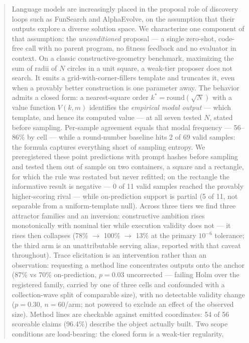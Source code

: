 \documentclass[11pt]{article}
\begin{document}
\begin{abstract}
Language models are increasingly placed in the proposal role of discovery loops such as
FunSearch and AlphaEvolve, on the assumption that their outputs explore a diverse solution
space. We characterize one component of that assumption: the \textit{unconditioned} proposal --- a
single zero-shot, code-free call with no parent program, no fitness feedback and no evaluator
in context. On a classic constructive-geometry benchmark, maximizing the sum of radii of $N$
circles in a unit square, a weak-tier proposer does not search. It emits a
grid-with-corner-fillers template and truncates it, even when a provably better construction is
one parameter away. The behavior admits a closed form: a nearest-square order $k^{*} = \mathrm{round}(\sqrt{N})$
with a value function $V(k, m)$ identifies the \textit{empirical modal output} --- which template, and
hence its computed value --- at all seven tested $N$, stated before sampling. Per-sample agreement equals that modal frequency --- 56--86\% by
cell --- while a round-number baseline hits 2 of 69 valid samples: the formula captures
everything short of sampling entropy. We preregistered these point predictions with prompt
hashes before sampling and tested them out of sample on two containers, a square and a
rectangle, for which the rule was restated but never refitted; on the rectangle the informative
result is negative --- 0 of 11 valid samples reached the provably higher-scoring rival --- while
on-prediction support is partial (5 of 11, not separable from a uniform-template null). Across three tiers we find three
attractor families and an inversion: constructive ambition rises monotonically with nominal
tier while execution validity does not --- it rises then collapses (78\% $\rightarrow$ 100\% $\rightarrow$ 13\% at the
primary $10^{-6}$ tolerance; the third arm is
an unattributable serving alias, reported with that caveat throughout). Trace elicitation is an
intervention rather than an observation: requesting a method line concentrates outputs onto the
anchor (87\% vs 70\% on-prediction, $p = 0.03$ uncorrected --- failing Holm over the registered
family, carried by one of three cells and confounded with a collection-wave split of comparable
size), with no detectable validity change ($p = 0.30$,
$n = 60$/arm; not powered to exclude an effect of the observed size). Method lines are checkable
against emitted coordinates: 54 of 56 scoreable claims (96.4\%) describe the object actually
built. Two scope conditions are load-bearing: the closed form is a weak-tier regularity,

\end{abstract}
\end{document}
